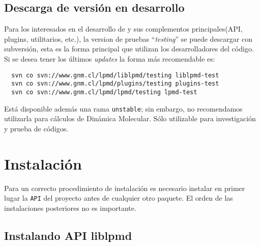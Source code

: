 \subsection{Descarga de versi\'on en desarrollo}

Para los interesados en el desarrollo de {\lpmd} y sus complementos principales(API, plugins, utilitarios, etc.), la version de pruebas ``\textit{testing}'' se puede descargar con subversi\'on, esta es la forma principal que utilizan los desarrolladores del c\'odigo. Si se desea tener los \'ultimos \textit{updates} la forma m\'as recomendable es:

\begin{center}
 \begin{verbatim}
  svn co svn://www.gnm.cl/lpmd/liblpmd/testing liblpmd-test
  svn co svn://www.gnm.cl/lpmd/plugins/testing plugins-test
  svn co svn://www.gnm.cl/lpmd/lpmd/testing lpmd-test
 \end{verbatim}
\end{center}

Est\'a disponible adem\'as una rama \verb|unstable|; sin embargo, no recomendamos utilizarla para c\'alculos de Din\'amica Molecular. S\'olo utilizable para investigaci\'on y prueba de c\'odigos.

\section{Instalaci\'on}

Para un correcto procedimiento de instalaci\'on es necesario instalar en primer lugar la \verb|API| del proyecto antes de cualquier otro paquete. El orden de las instalaciones posteriores no es importante.


\subsection{Instalando API liblpmd}

